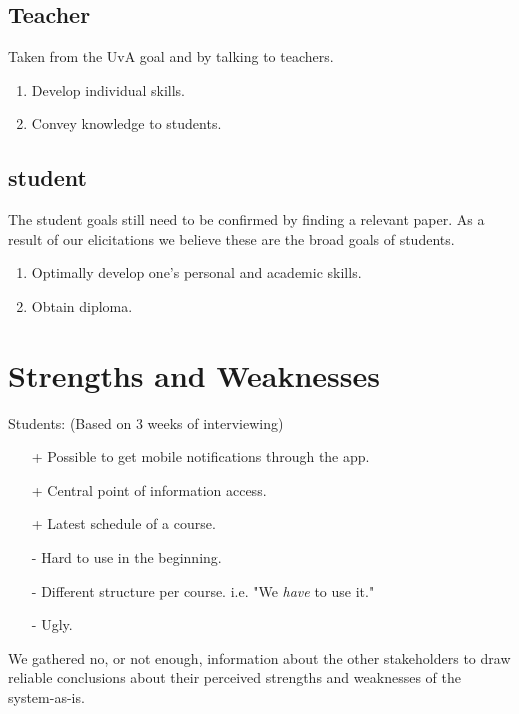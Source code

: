 \subsection{Teacher}
Taken from the UvA goal and by talking to teachers.
\begin{enumerate}
	\item Develop individual skills.
	\item Convey knowledge to students.
\end{enumerate}

\subsection{student}
The student goals still need to be confirmed by finding a relevant paper. As a result of our elicitations we believe these are the broad goals of students.
\begin{enumerate}
	\item Optimally develop one's personal and academic skills.	
	\item Obtain diploma.
\end{enumerate}

\section{Strengths and Weaknesses}
Students: (Based on 3 weeks of interviewing)
\begin{itemize}
	\item[+] Possible to get mobile notifications through the app.
    \item[+] Central point of information access.
	\item[+] Latest schedule of a course.
	\item[-] Hard to use in the beginning.
	\item[-] Different structure per course.
  i.e. "We \textit{have} to use it."
	\item[-] Ugly.
\end{itemize}

We gathered no, or not enough, information about the other stakeholders to draw reliable conclusions about their perceived strengths and weaknesses of the system-as-is.


